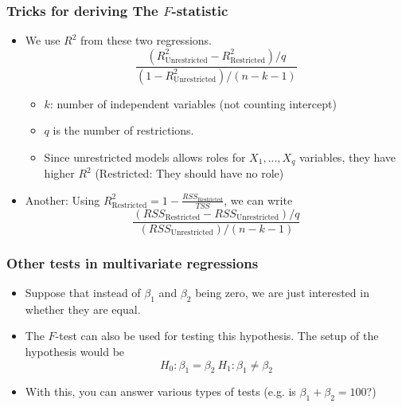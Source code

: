 \documentclass[aspectratio=169]{beamer}
\begin{document}
\begin{frame}
\frametitle{Tricks for deriving The $F$-statistic}
\begin{itemize}
 \item We use $R^2$ from these two regressions. 
\[
\frac{(R^2_{\text{Unrestricted}}-R^2_{\text{Restricted}})/q}{(1-R^2_{\text{Unrestricted}})/(n-k-1)}
\]
\begin{itemize}
\item $k$: number of independent variables (not counting intercept)
\item $q$ is the number of restrictions. 
\item Since unrestricted models allows roles for $X_1,...,X_q$ variables, they have higher $R^2$ (Restricted: They should have no role)
\end{itemize}
\item Another: Using $R^2_{\text{Restricted}} = 1-\frac{RSS_{\text{Restricted}}}{TSS}$, we can write
\[
\frac{(RSS_{\text{Restricted}}-RSS_{\text{Unrestricted}})/q}{(RSS_{\text{Unrestricted}})/(n-k-1)}
\] 
\end{itemize}
\end{frame}

\begin{frame}
\frametitle{Other tests in multivariate regressions}
\begin{itemize}
\item Suppose that instead of $\beta_1$ and $\beta_2$ being zero, we are just interested in whether they are equal.
\item The $F$-test can also be used for testing this hypothesis. The setup of the hypothesis would be
\[
H_0: \beta_1 = \beta_2 \ H_1: \beta_1 \neq \beta_2
\]
\item With this, you can answer various types of tests (e.g. is $\beta_1+\beta_2=100$?)
\end{itemize}
\end{frame}


\end{document}

